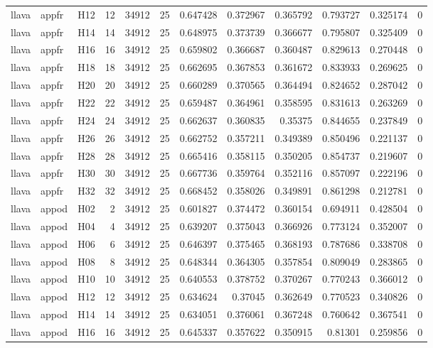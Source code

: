 \begin{longtable}{lllrrrrrrrrr}
llava & appfr & H12 & 12 & 34912 & 25 & 0.647428 & 0.372967 & 0.365792 & 0.793727 & 0.325174 & 0 \\
llava & appfr & H14 & 14 & 34912 & 25 & 0.648975 & 0.373739 & 0.366677 & 0.795807 & 0.325409 & 0 \\
llava & appfr & H16 & 16 & 34912 & 25 & 0.659802 & 0.366687 & 0.360487 & 0.829613 & 0.270448 & 0 \\
llava & appfr & H18 & 18 & 34912 & 25 & 0.662695 & 0.367853 & 0.361672 & 0.833933 & 0.269625 & 0 \\
llava & appfr & H20 & 20 & 34912 & 25 & 0.660289 & 0.370565 & 0.364494 & 0.824652 & 0.287042 & 0 \\
llava & appfr & H22 & 22 & 34912 & 25 & 0.659487 & 0.364961 & 0.358595 & 0.831613 & 0.263269 & 0 \\
llava & appfr & H24 & 24 & 34912 & 25 & 0.662637 & 0.360835 & 0.35375 & 0.844655 & 0.237849 & 0 \\
llava & appfr & H26 & 26 & 34912 & 25 & 0.662752 & 0.357211 & 0.349389 & 0.850496 & 0.221137 & 0 \\
llava & appfr & H28 & 28 & 34912 & 25 & 0.665416 & 0.358115 & 0.350205 & 0.854737 & 0.219607 & 0 \\
llava & appfr & H30 & 30 & 34912 & 25 & 0.667736 & 0.359764 & 0.352116 & 0.857097 & 0.222196 & 0 \\
llava & appfr & H32 & 32 & 34912 & 25 & 0.668452 & 0.358026 & 0.349891 & 0.861298 & 0.212781 & 0 \\
llava & appod & H02 & 2 & 34912 & 25 & 0.601827 & 0.374472 & 0.360154 & 0.694911 & 0.428504 & 0 \\
llava & appod & H04 & 4 & 34912 & 25 & 0.639207 & 0.375043 & 0.366926 & 0.773124 & 0.352007 & 0 \\
llava & appod & H06 & 6 & 34912 & 25 & 0.646397 & 0.375465 & 0.368193 & 0.787686 & 0.338708 & 0 \\
llava & appod & H08 & 8 & 34912 & 25 & 0.648344 & 0.364305 & 0.357854 & 0.809049 & 0.283865 & 0 \\
llava & appod & H10 & 10 & 34912 & 25 & 0.640553 & 0.378752 & 0.370267 & 0.770243 & 0.366012 & 0 \\
llava & appod & H12 & 12 & 34912 & 25 & 0.634624 & 0.37045 & 0.362649 & 0.770523 & 0.340826 & 0 \\
llava & appod & H14 & 14 & 34912 & 25 & 0.634051 & 0.376061 & 0.367248 & 0.760642 & 0.367541 & 0 \\
llava & appod & H16 & 16 & 34912 & 25 & 0.645337 & 0.357622 & 0.350915 & 0.81301 & 0.259856 & 0 \\

\end{longtable}
